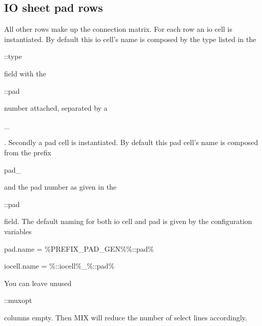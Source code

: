 \documentclass[a4paper,12pt]{article}
\begin{document}
\subsection{IO sheet pad rows}
All other rows make up the connection matrix. For each row an io cell is instantiated. By default this io cell's name is composed by the type listed in the \begin{tt}::type\end{tt} field with the \begin{tt}::pad\end{tt} number attached, separated by a \begin{tt}\_\end{tt}.\newline
Secondly a pad cell is instantiated. By default this pad cell's name is composed from the prefix \begin{tt}pad\_\end{tt} and the pad number as given in the \begin{tt}::pad\end{tt} field. The default naming for both io cell and pad is given by the configuration variables\newline
\hspace*{20mm}\begin{tt}pad.name = \%PREFIX\_PAD\_GEN\%\%::pad\%\end{tt}\newline
\hspace*{20mm}\begin{tt}iocell.name = \%::iocell\%\_\%::pad\%\end{tt}\newline
You can leave unused \begin{tt}::muxopt\end{tt} columns empty. Then MIX will reduce the number of select lines accordingly.
\end{document}
